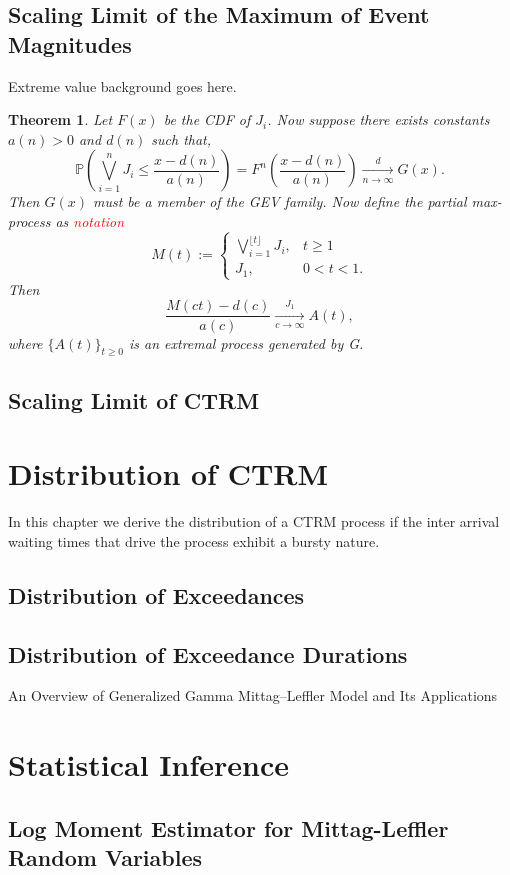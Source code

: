 \documentclass[honours,12pt]{UNSWthesis}
\newcommand{\PP}{\mathbb{P}}
\newcommand{\1}{\mathbf 1}
\newtheorem{theorem}{Theorem}[section]
\numberwithin{equation}{section}
\theoremstyle{definition}
\theoremstyle{remark}
\begin{document}
\section{Scaling Limit of the Maximum of Event Magnitudes}\label{s-max}

Extreme value background goes here.

\begin{theorem}\cite{Lamperti1964}
Let $F(x)$ be the CDF of $J_i$. Now suppose there exists constants $a(n)>0$ and $d(n)$ such that,
\[
	\PP\left(\bigvee_{i=1}^n J_i\leq \frac{x-d(n)}{a(n)}\right)=F^n\left(\frac{x-d(n)}{a(n)}\right) \xrightarrow[n\to \infty]{d} G(x).
\]
Then $G(x)$ must be a member of the GEV family. Now define the partial max-process as \textcolor{red}{notation}
\[
	M(t):=
	\begin{cases}
	      \bigvee_{i=1}^{\lfloor{t}\rfloor} J_i, &\textrm{$t\geq 1$}\\
	         J_1, &\textrm{$0<t<1.$}
	\end{cases}
\]
Then 
\[
\frac{M(ct)-d(c)}{a(c)} \xrightarrow[c\to \infty]{J_1} A(t),
\]
where $\{A(t)\}_{t\geq0}$ is an extremal process generated by G.
\end{theorem}

\section{Scaling Limit of CTRM}

\chapter{Distribution of CTRM}
In this chapter we derive the distribution of a CTRM process if the inter arrival waiting times that drive the process exhibit a bursty nature.
\section{Distribution of Exceedances}
\section{Distribution of Exceedance Durations}


An Overview of Generalized Gamma Mittag–Leffler Model and Its Applications 


\chapter{Statistical Inference}
\section{Log Moment Estimator for Mittag-Leffler Random Variables}
\end{document}

